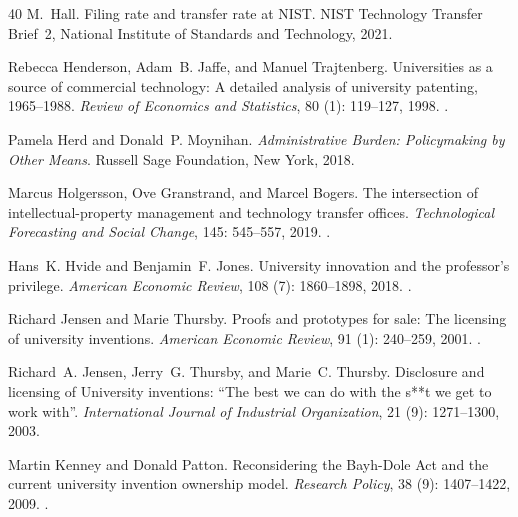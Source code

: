 \begin{thebibliography}{40}
M.~Hall.
\newblock Filing rate and transfer rate at {NIST}.
\newblock NIST Technology Transfer Brief~2, National Institute of Standards and
  Technology, 2021.

Rebecca Henderson, Adam~B. Jaffe, and Manuel Trajtenberg.
\newblock Universities as a source of commercial technology: A detailed
  analysis of university patenting, 1965--1988.
\newblock \emph{Review of Economics and Statistics}, 80 (1):
  119--127, 1998.
\newblock {}.

Pamela Herd and Donald~P. Moynihan.
\newblock \emph{Administrative Burden: Policymaking by Other Means}.
\newblock Russell Sage Foundation, New York, 2018.

Marcus Holgersson, Ove Granstrand, and Marcel Bogers.
\newblock The intersection of intellectual-property management and technology
  transfer offices.
\newblock \emph{Technological Forecasting and Social Change}, 145:
  545--557, 2019.
\newblock {}.

Hans~K. Hvide and Benjamin~F. Jones.
\newblock University innovation and the professor's privilege.
\newblock \emph{American Economic Review}, 108 (7):
  1860--1898, 2018.
\newblock {}.

Richard Jensen and Marie Thursby.
\newblock Proofs and prototypes for sale: The licensing of university
  inventions.
\newblock \emph{American Economic Review}, 91 (1): 240--259,
  2001.
\newblock {}.

Richard~A. Jensen, Jerry~G. Thursby, and Marie~C. Thursby.
\newblock Disclosure and licensing of {University} inventions: ``{The} best we
  can do with the s**t we get to work with''.
\newblock \emph{International Journal of Industrial Organization}, 21
  (9): 1271--1300, 2003.

Martin Kenney and Donald Patton.
\newblock Reconsidering the {Bayh-Dole Act} and the current university
  invention ownership model.
\newblock \emph{Research Policy}, 38 (9): 1407--1422, 2009.
\newblock {}.


\end{thebibliography}
